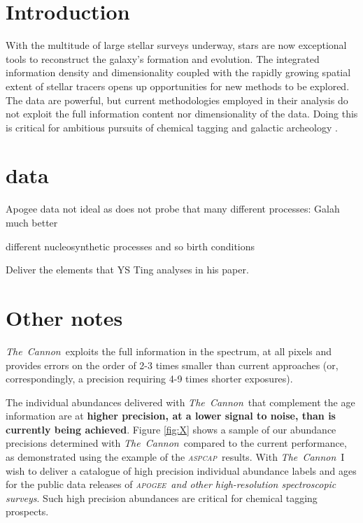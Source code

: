 \documentclass[12pt, preprint]{aastex}
\newcommand{\project}[1]{\textsl{#1}}
\newcommand{\tc}{\project{The~Cannon}}
\newcommand{\apogee}{\project{\textsc{apogee}}}
\newcommand{\aspcap}{\project{\textsc{aspcap}}}
\newcommand{\teff}{\mbox{$\rm T_{eff}$}}
\newcommand{\feh}{\mbox{$\rm [Fe/H]$}}
\newcommand{\alphafe}{\mbox{$\rm [\alpha/Fe]$}}
\newcommand{\logg}{\mbox{$\rm \log g$}}
\begin{document}

\section{Introduction}\label{sec:Intro}

With the multitude of large stellar surveys underway, stars are now exceptional tools to reconstruct the galaxy's formation and evolution. The integrated information density and dimensionality coupled with the rapidly growing spatial extent of stellar tracers opens up opportunities for new methods to be explored. The data are powerful, but current methodologies employed in their analysis do not exploit the full information content nor dimensionality of the data. Doing this is critical for ambitious pursuits of chemical tagging \citep[e.g.][]{Ting2015} and galactic archeology \citep{Freeman2002, Martell2015}. 

\section{data}

Apogee data not ideal as does not probe that many different processes: Galah much better

different nucleosynthetic processes and so birth conditions

Deliver the elements that YS Ting analyses in his paper. 


\section{Other notes} 

\tc\ exploits the full information in the spectrum, at all pixels and provides errors on the order of 2-3 times smaller than current approaches (or, correspondingly, a precision requiring 4-9 times shorter exposures). %

The individual abundances delivered with \tc\ that complement the age information are at \textbf{ higher precision, at a lower signal to noise, than is currently being achieved}. Figure \ref{fig:X} shows a sample of our abundance precisions determined with \tc\ compared to the current performance, as demonstrated using the example of the \aspcap\ results. With \tc\ I wish to deliver a catalogue of high precision individual abundance labels and ages for the public data releases of \apogee\ \textit{and other high-resolution spectroscopic surveys}. Such high precision abundances are critical for chemical tagging prospects. \\%
\end{document}
